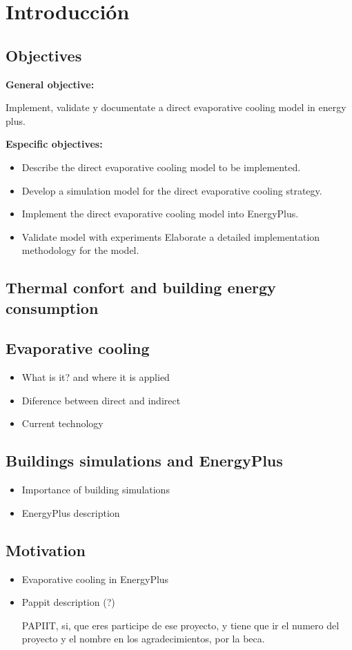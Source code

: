 \chapter{Introducción}
\label{chap:introduccion}

 
 \section{Objectives}
 
 \textbf{General objective:}
 
 Implement, validate y documentate a direct evaporative cooling model in energy plus.
 
 
 \textbf{Especific objectives:}
 
 \begin{itemize}
 \item Describe the direct evaporative cooling model to be implemented.
 \item Develop a simulation model for the direct evaporative cooling strategy.
 \item Implement the direct  evaporative cooling model into EnergyPlus.
\item Validate model with experiments 
Elaborate a detailed implementation methodology for the model.

 \end{itemize}
 
 
 \section{Thermal confort and building energy consumption}
 
 \section{Evaporative cooling}
 
 \begin{itemize}
 	\item What is it? and where it is applied 
 	\item Diference between direct and indirect
 	\item Current technology
 \end{itemize}
 
 \section{Buildings simulations and EnergyPlus}
  
   \begin{itemize}
 	\item Importance of building simulations
 	\item EnergyPlus description
   \end{itemize}
 
 \section{Motivation}
 
   \begin{itemize}
 	\item Evaporative cooling in EnergyPlus
 	\item Pappit description (?)
 	
 	
 	PAPIIT, si, que eres participe de ese 		proyecto, y tiene que ir el numero del 		proyecto y el nombre en los 				agradecimientos, por la beca.
 	
   \end{itemize}